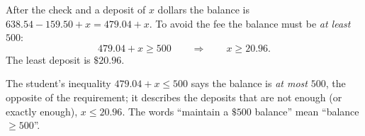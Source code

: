After the check and a deposit of $x$ dollars the balance is $638.54-159.50+x=479.04+x$. To avoid the fee the balance must be \emph{at least} $500$:
\[
479.04+x\ge500\qquad\Longrightarrow\qquad x\ge20.96 .
\]
The least deposit is $\boxed{\$20.96}$.

The student's inequality $479.04+x\le500$ says the balance is \emph{at most} $500$, the opposite of the requirement; it describes the deposits that are not enough (or exactly enough), $x\le20.96$. The words ``maintain a $\$500$ balance'' mean ``balance $\ge500$''.
